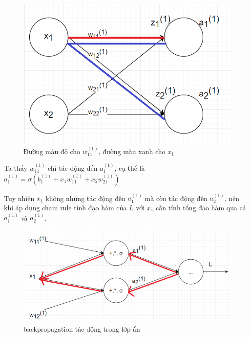 \FloatBarrier
\begin{figure}[htp]
\begin{center}
\includegraphics[scale=0.75]{chap2/c2_figs/1.png}
\end{center}
\caption{Đường màu đỏ cho $w_{11}^{(1)}$, đường màu xanh cho $x_1$}
\label{fig:feed_forward}
\end{figure}
\FloatBarrier

Ta thấy $w_{11}^{(1)}$ chỉ tác động đến $a_1^{(1)}$, cụ thể là $ a_1^{(1)} = \sigma(b_1^{(1)} + x_1w_{11}^{(1)} + x_2w_{21}^{(1)})$ 

Tuy nhiên $x_1$ không những tác động đến $a_1^{(1)}$ mà còn tác động đến $a_2^{(1)}$, nên khi áp dụng chain rule tính đạo hàm của $L$ với $x_1$ cần tính tổng đạo hàm qua cả $a_1^{(1)}$ và $a_2^{(1)}$.

\FloatBarrier
\begin{figure}[htp]
\begin{center}
\includegraphics[scale=0.75]{chap2/c2_figs/2.png}
\end{center}
\caption{backpropagation tác động trong lớp ẩn}
\label{fig:feed_forward}
\end{figure}
\FloatBarrier

